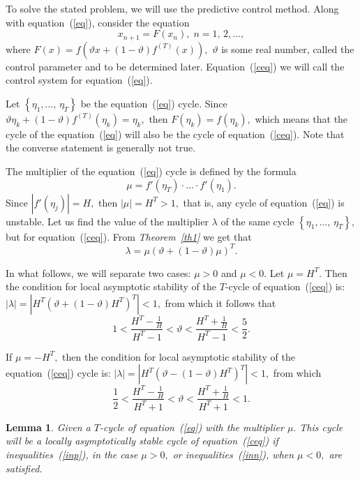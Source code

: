 \documentclass[12pt,a4paper]{amsart}
\newtheorem{lemma}{Lemma}
\begin{document}
To solve the stated problem, we will use the predictive control method. Along with equation~(\ref{eq}), consider the equation
\begin{equation}\label{ceq}
x_{n+1}=F(x_n),\;n=1,\,2,\ldots,
\end{equation}
where $F(x)=f\left(\vartheta x + (1-\vartheta)f^{(T)}(x)\right),$ $\vartheta$ is some real number, called the control parameter and to be determined later.
Equation~(\ref{ceq}) we will call the control system for equation~(\ref{eq}). 

Let $\left\{\eta_1,\ldots,\,\eta_T\right\}$ be the equation~(\ref{eq}) cycle. Since $\vartheta \eta_k + (1-\vartheta)f^{(T)}(\eta_k)=\eta_k,$ then 
$F(\eta_k)=f(\eta_k),$ which means that the cycle of the equation~(\ref{eq}) will also be the cycle of equation~(\ref{ceq}). Note that the converse statement 
is generally not true. 

The multiplier of the equation~(\ref{eq}) cycle is defined by the formula
$$
\mu = f'(\eta_T)\cdot\ldots\cdot f'(\eta_1). 
$$
Since $\left|f'(\eta_j)\right|=H,$ then $|\mu|=H^T>1,$ that is, any cycle of equation~(\ref{eq}) is unstable. Let us find the value of the multiplier 
$\lambda$ of the same cycle $\left\{\eta_1,\ldots,\,\eta_T\right\},$ but for equation~(\ref{ceq}). From \textit{Theorem~\ref{th1}} we get that 
$$
\lambda=\mu \left(\vartheta+(1-\vartheta)\mu\right)^T. 
$$

In what follows, we will separate two cases: $\mu>0$ and $\mu<0.$ Let $\mu=H^T.$ Then the condition for local asymptotic stability 
of the $T$-cycle of equation~(\ref{ceq}) is: $|\lambda|=\left|H^T \left(\vartheta + (1-\vartheta)H^T\right)^T\right|<1,$ 
from which it follows that 
\begin{equation}\label{inp}
1<
\frac{H^T-\frac{1}{H}}{H^T-1}<
\vartheta<
\frac{H^T+\frac{1}{H}}{H^T-1}<
\frac52.
\end{equation}

If $\mu=-H^T,$ then the condition for local asymptotic stability of the equation~(\ref{ceq}) cycle is: 
$|\lambda|=\left|H^T \left(\vartheta - (1-\vartheta)H^T\right)^T\right|<1,$
from which 
\begin{equation}\label{inn}
\frac12<
\frac{H^T-\frac{1}{H}}{H^T+1}<
\vartheta<
\frac{H^T+\frac{1}{H}}{H^T+1}<
1.
\end{equation}

\begin{lemma}\label{l1}
Given a $T$-cycle of equation~(\ref{eq}) with the multiplier $\mu.$ This cycle will be a locally asymptotically stable cycle of 
equation~(\ref{ceq}) if inequalities~(\ref{inp}), in the case $\mu>0,$ or inequalities~(\ref{inn}), when $\mu<0,$ are satisfied.
\end{lemma}
\end{document}
